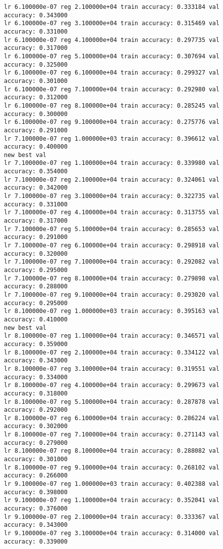 \documentclass[11pt]{article}
\begin{document}
\begin{Verbatim}[commandchars=\\\{\}]
lr 6.100000e-07 reg 2.100000e+04 train accuracy: 0.333184 val accuracy: 0.343000
lr 6.100000e-07 reg 3.100000e+04 train accuracy: 0.315469 val accuracy: 0.331000
lr 6.100000e-07 reg 4.100000e+04 train accuracy: 0.297735 val accuracy: 0.317000
lr 6.100000e-07 reg 5.100000e+04 train accuracy: 0.307694 val accuracy: 0.325000
lr 6.100000e-07 reg 6.100000e+04 train accuracy: 0.299327 val accuracy: 0.301000
lr 6.100000e-07 reg 7.100000e+04 train accuracy: 0.292980 val accuracy: 0.312000
lr 6.100000e-07 reg 8.100000e+04 train accuracy: 0.285245 val accuracy: 0.300000
lr 6.100000e-07 reg 9.100000e+04 train accuracy: 0.275776 val accuracy: 0.291000
lr 7.100000e-07 reg 1.000000e+03 train accuracy: 0.396612 val accuracy: 0.400000
new best val
lr 7.100000e-07 reg 1.100000e+04 train accuracy: 0.339980 val accuracy: 0.354000
lr 7.100000e-07 reg 2.100000e+04 train accuracy: 0.324061 val accuracy: 0.342000
lr 7.100000e-07 reg 3.100000e+04 train accuracy: 0.322735 val accuracy: 0.331000
lr 7.100000e-07 reg 4.100000e+04 train accuracy: 0.313755 val accuracy: 0.317000
lr 7.100000e-07 reg 5.100000e+04 train accuracy: 0.285653 val accuracy: 0.291000
lr 7.100000e-07 reg 6.100000e+04 train accuracy: 0.298918 val accuracy: 0.320000
lr 7.100000e-07 reg 7.100000e+04 train accuracy: 0.292082 val accuracy: 0.295000
lr 7.100000e-07 reg 8.100000e+04 train accuracy: 0.279898 val accuracy: 0.288000
lr 7.100000e-07 reg 9.100000e+04 train accuracy: 0.293020 val accuracy: 0.295000
lr 8.100000e-07 reg 1.000000e+03 train accuracy: 0.395163 val accuracy: 0.410000
new best val
lr 8.100000e-07 reg 1.100000e+04 train accuracy: 0.346571 val accuracy: 0.359000
lr 8.100000e-07 reg 2.100000e+04 train accuracy: 0.334122 val accuracy: 0.343000
lr 8.100000e-07 reg 3.100000e+04 train accuracy: 0.319551 val accuracy: 0.334000
lr 8.100000e-07 reg 4.100000e+04 train accuracy: 0.299673 val accuracy: 0.318000
lr 8.100000e-07 reg 5.100000e+04 train accuracy: 0.287878 val accuracy: 0.292000
lr 8.100000e-07 reg 6.100000e+04 train accuracy: 0.286224 val accuracy: 0.302000
lr 8.100000e-07 reg 7.100000e+04 train accuracy: 0.271143 val accuracy: 0.279000
lr 8.100000e-07 reg 8.100000e+04 train accuracy: 0.288082 val accuracy: 0.301000
lr 8.100000e-07 reg 9.100000e+04 train accuracy: 0.268102 val accuracy: 0.266000
lr 9.100000e-07 reg 1.000000e+03 train accuracy: 0.402388 val accuracy: 0.398000
lr 9.100000e-07 reg 1.100000e+04 train accuracy: 0.352041 val accuracy: 0.376000
lr 9.100000e-07 reg 2.100000e+04 train accuracy: 0.333367 val accuracy: 0.343000
lr 9.100000e-07 reg 3.100000e+04 train accuracy: 0.314000 val accuracy: 0.339000

\end{Verbatim}
\end{document}
